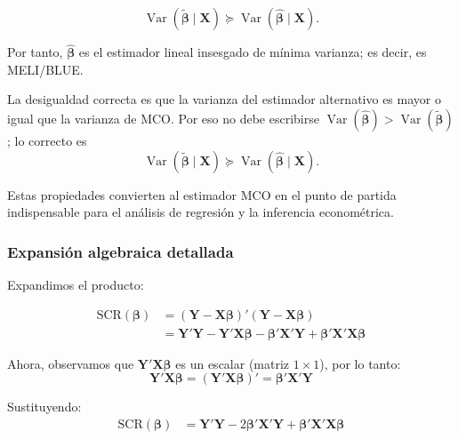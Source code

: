 \documentclass[11pt,a4paper]{article}
\DeclareMathOperator{\Var}{Var}
\newenvironment{demostración}[1][]{%
\begin{tcolorbox}[
ccdebox,
colback=white,
colframe=ccdeaccent,
title={Demostración\ifstrempty{#1}{}{ -- #1}},
boxed title style={colback=ccdeaccent}
]
}{\end{tcolorbox}}
\begin{document}
\[
\Var(\tilde{\boldsymbol{\beta}}\mid\mathbf{X})\succeq
\Var(\hat{\boldsymbol{\beta}}\mid\mathbf{X}).
\]

Por tanto, \(\hat{\boldsymbol{\beta}}\) es el estimador lineal insesgado de mínima varianza; es decir, es MELI/BLUE.

\begin{observacion}
La desigualdad correcta es que la varianza del estimador alternativo es mayor o igual que la varianza de MCO. Por eso no debe escribirse \(\Var(\hat{\boldsymbol{\beta}})>\Var(\tilde{\boldsymbol{\beta}})\); lo correcto es
\[
\Var(\tilde{\boldsymbol{\beta}}\mid\mathbf{X})\succeq
\Var(\hat{\boldsymbol{\beta}}\mid\mathbf{X}).
\]
\end{observacion}

Estas propiedades convierten al estimador MCO en el punto de partida indispensable para el análisis de regresión y la inferencia econométrica.

\subsubsection*{Expansión algebraica detallada}
 
\begin{demostración}[Expansión de SCR]
 
Expandimos el producto:
 
\begin{align}
\text{SCR}(\boldsymbol{\beta}) &= (\mathbf{Y} - \mathbf{X}\boldsymbol{\beta})'(\mathbf{Y} - \mathbf{X}\boldsymbol{\beta}) \\
&= \mathbf{Y}'\mathbf{Y} - \mathbf{Y}'\mathbf{X}\boldsymbol{\beta} - \boldsymbol{\beta}'\mathbf{X}'\mathbf{Y} + \boldsymbol{\beta}'\mathbf{X}'\mathbf{X}\boldsymbol{\beta}
\end{align}
 
Ahora, observamos que $\mathbf{Y}'\mathbf{X}\boldsymbol{\beta}$ es un escalar (matriz $1 \times 1$), por lo tanto:
\[
\mathbf{Y}'\mathbf{X}\boldsymbol{\beta} = (\mathbf{Y}'\mathbf{X}\boldsymbol{\beta})' = \boldsymbol{\beta}'\mathbf{X}'\mathbf{Y}
\]
 
Sustituyendo:
\begin{align}
\text{SCR}(\boldsymbol{\beta}) &= \mathbf{Y}'\mathbf{Y} - 2\boldsymbol{\beta}'\mathbf{X}'\mathbf{Y} + \boldsymbol{\beta}'\mathbf{X}'\mathbf{X}\boldsymbol{\beta}
\end{align}
 
\end{demostración}
 
\end{document}
